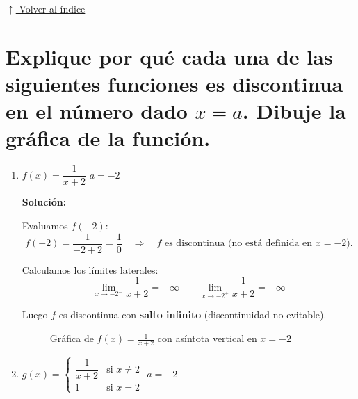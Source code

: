 \documentclass[12pt]{article}
\newcommand{\solucion}{%
    \vspace{0.8em}%
    \textbf{Solución:}%
}
\newcommand{\volverindice}{%
    \vspace{1em}%
    \begin{flushright}%
        \hyperlink{indice}{\small $\uparrow$ Volver al índice}%
    \end{flushright}%
}
\begin{document}
\volverindice
\newpage

\newpage
\section[Funciones discontinuas]{Explique por qué cada una de las siguientes funciones es discontinua en el número dado $x = a$. Dibuje la gráfica de la función.}

\begin{enumerate}[label=\alph*)]

    \item $f(x) = \dfrac{1}{x+2}$ \quad $a = -2$

    \solucion

    Evaluamos $f(-2)$:
    \[
    f(-2) = \frac{1}{-2+2} = \frac{1}{0} \quad \Rightarrow \quad f \text{ es discontinua (no está definida en } x = -2\text{).}
    \]

    Calculamos los límites laterales:
    \[
    \lim_{x \to -2^-} \frac{1}{x+2} = -\infty \qquad \lim_{x \to -2^+} \frac{1}{x+2} = +\infty
    \]

    Luego $f$ es discontinua con \textbf{salto infinito} (discontinuidad no evitable).

\begin{figure}[h]
    \centering
    \caption{Gráfica de $f(x) = \frac{1}{x+2}$ con asíntota vertical en $x=-2$}
    \label{fig:funcion_11a}
    \end{figure}

    \newpage
    \item $g(x) = \begin{cases} \dfrac{1}{x+2} & \text{si } x \neq 2 \\ 1 & \text{si } x = 2 \end{cases}$ \quad $a = -2$


\end{enumerate}
\end{document}
